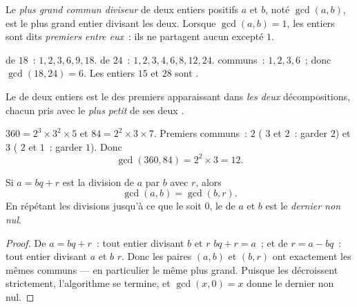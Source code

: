 \begin{definition}[PGCD]\label{def:g9:arith:gcd}
Le \emph{plus grand commun diviseur} de deux entiers positifs $a$ et $b$, noté
$\gcd(a, b)$, est le plus grand entier divisant les deux. Lorsque
$\gcd(a, b) = 1$, les entiers sont dits \emph{premiers entre
eux}~: ils ne partagent aucun 
excepté $1$.
\end{definition}

\begin{example}
 de $18$~: $1, 2, 3, 6, 9, 18$.  de $24$~: $1, 2, 3,
4, 6, 8, 12, 24$.  communs~: $1, 2, 3, 6$~; donc
$\gcd(18, 24) = 6$. Les entiers $15$ et $28$ sont .
\end{example}

\begin{proposition}\label{prop:g9:arith:gcdfact}
Le  de deux entiers est le  des premiers apparaissant dans
\emph{les deux} décompositions, chacun pris avec le \emph{plus petit}
de ses deux .
\end{proposition}
\admitted

\begin{example}\label{ex:g9:arith:gcdfact}
$360 = 2^3 \times 3^2 \times 5$ et $84 = 2^2 \times 3 \times 7$.
Premiers communs~: $2$ ( $3$ et $2$~: garder $2$) et $3$
( $2$ et $1$~: garder $1$). Donc
\[
\gcd(360, 84) = 2^2 \times 3 = 12 .
\]
\end{example}

\begin{theorem}\label{thm:g9:arith:euclidalgo}
Si $a = bq + r$ est la division de $a$ par $b$ avec  $r$, alors
\[
\gcd(a, b) = \gcd(b, r).
\]
En répétant les divisions jusqu'à ce que le  soit $0$, le  de
$a$ et $b$ est le \emph{dernier  non nul}.
\end{theorem}

\begin{proof}
De $a = bq + r$~: tout entier divisant $b$ et $r$  $bq + r = a$~;
et de $r = a - bq$~: tout entier divisant $a$ et $b$  $r$. Donc
les paires $(a, b)$ et $(b, r)$ ont exactement les mêmes 
communs --- en particulier le même plus grand. Puisque les 
décroissent strictement, l'algorithme se termine, et $\gcd(x, 0) = x$
donne le dernier  non nul.
\end{proof}

